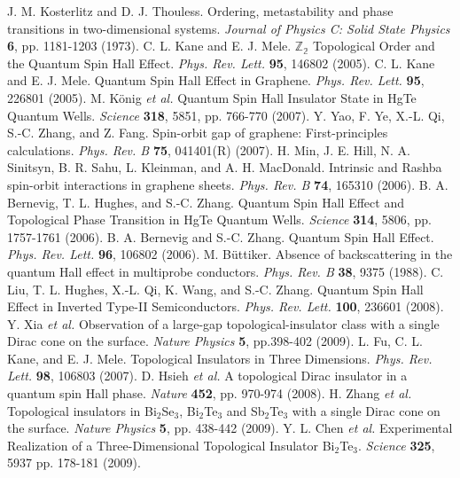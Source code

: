 \documentclass[titlepage,a4paper]{book}
\begin{document}
\begin{thebibliography}{199}
J. M. Kosterlitz and D. J. Thouless. Ordering, metastability and phase transitions in two-dimensional systems. \textit{Journal of Physics C: Solid State Physics} \textbf{6}, pp. 1181-1203 (1973).
C. L. Kane and E. J. Mele. $\mathbb{Z_2}$ Topological Order and the Quantum Spin Hall Effect. \textit{Phys. Rev. Lett.} \textbf{95}, 146802 (2005).
C. L. Kane and E. J. Mele. Quantum Spin Hall Effect in Graphene. \textit{Phys. Rev. Lett.} \textbf{95}, 226801 (2005).
M. König \textit{et al.} Quantum Spin Hall Insulator State in HgTe Quantum Wells. \textit{Science} \textbf{318}, 5851, pp. 766-770 (2007).
Y. Yao, F. Ye, X.-L. Qi, S.-C. Zhang, and Z. Fang. Spin-orbit gap of graphene: First-principles calculations. \textit{Phys. Rev. B} \textbf{75}, 041401(R) (2007).
H. Min, J. E. Hill, N. A. Sinitsyn, B. R. Sahu, L. Kleinman, and A. H. MacDonald. Intrinsic and Rashba spin-orbit interactions in graphene sheets. \textit{Phys. Rev. B} \textbf{74}, 165310 (2006).
B. A. Bernevig, T. L. Hughes, and S.-C. Zhang. Quantum Spin Hall Effect and Topological Phase Transition in HgTe Quantum Wells. \textit{Science} \textbf{314}, 5806, pp. 1757-1761 (2006).
B. A. Bernevig and S.-C. Zhang. Quantum Spin Hall Effect. \textit{Phys. Rev. Lett.} \textbf{96}, 106802 (2006).
M. Büttiker. Absence of backscattering in the quantum Hall effect in multiprobe conductors. \textit{Phys. Rev. B} \textbf{38}, 9375 (1988).
C. Liu, T. L. Hughes, X.-L. Qi, K. Wang, and S.-C. Zhang. Quantum Spin Hall Effect in Inverted Type-II Semiconductors. \textit{Phys. Rev. Lett.} \textbf{100}, 236601 (2008).
Y. Xia \textit{et al.} Observation of a large-gap topological-insulator class with a single Dirac cone on the surface. \textit{Nature Physics} \textbf{5}, pp.398-402 (2009).
L. Fu, C. L. Kane, and E. J. Mele. Topological Insulators in Three Dimensions. \textit{Phys. Rev. Lett.} \textbf{98}, 106803 (2007).
D. Hsieh \textit{et al.} A topological Dirac insulator in a quantum spin Hall phase. \textit{Nature} \textbf{452}, pp. 970-974 (2008).
H. Zhang \textit{et al.} Topological insulators in Bi$_2$Se$_3$, Bi$_2$Te$_3$ and Sb$_2$Te$_3$ with a single Dirac cone on the surface. \textit{Nature Physics} \textbf{5}, pp. 438-442 (2009).
Y. L. Chen \textit{et al.} Experimental Realization of a Three-Dimensional Topological Insulator Bi$_2$Te$_3$. \textit{Science} \textbf{325}, 5937 pp. 178-181 (2009).

\end{thebibliography}
\end{document}
